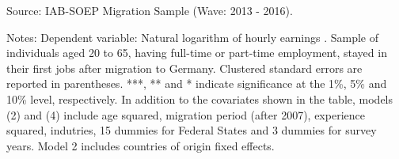 \documentclass[12pt,a4paper]{article}
\begin{document}
\begin{table}[htbp]
\begin{tablenotes}
      \tiny
      \item Source: IAB-SOEP Migration Sample (Wave: 2013 - 2016).
      \item Notes: Dependent variable: Natural logarithm of hourly earnings . Sample of individuals aged 20 to 65, having full-time or part-time employment, stayed in their first jobs after migration to Germany. Clustered standard errors are reported in parentheses.  ***, ** and * indicate significance at the 1\%, 5\% and 10\% level, respectively. In addition to the covariates shown in the table, models (2) and (4) include age squared, migration period (after 2007),  experience squared, indutries, 15 dummies for Federal States and 3 dummies for survey years. Model 2 includes countries of origin fixed effects.
    \end{tablenotes}
\end{table}%
\end{document}
